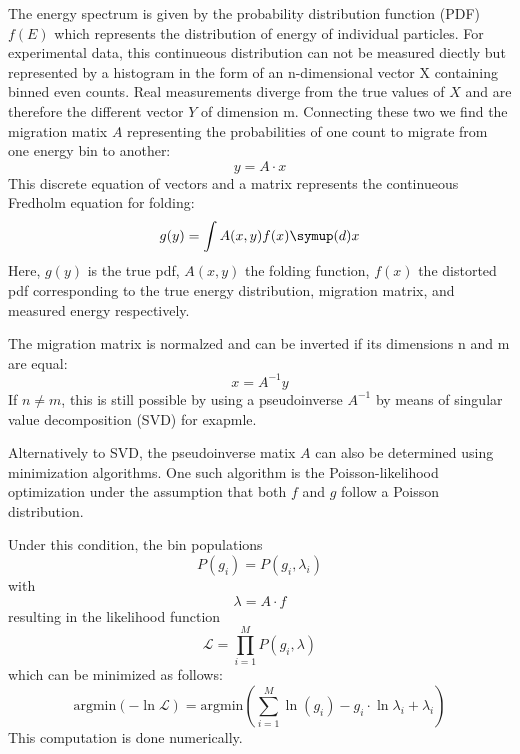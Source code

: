    The energy spectrum is given by the probability distribution function (PDF) $f(E)$ which represents the distribution of energy of individual particles.
    For experimental data, this continueous distribution can not be measured diectly but represented by a histogram in the form of an n-dimensional vector X containing binned even counts.
    Real measurements diverge from the true values of $X$ and are therefore the different vector $Y$ of dimension m.
    Connecting these two we find the migration matix $A$ representing the probabilities of one count to migrate from one energy bin to another:
    \begin{equation}
        y = A \cdot x
        \label{eqn:folding}
    \end{equation} 
    This discrete equation of vectors and a matrix represents the continueous Fredholm equation for folding:
    \begin{equation}
        g(y)= \int A(x,y)f(x) \symup(d)x 
    \end{equation}
    Here, $g(y)$ is the true pdf, $A(x,y)$ the folding function, $f(x)$ the distorted pdf corresponding to the true energy distribution, migration matrix, and measured energy respectively.

    The migration matrix is normalzed and can be inverted if its dimensions n and m are equal:
    \begin{equation}
        x = A^{-1}y
        \label{eqn:unfolding}
    \end{equation}
    If $n \neq m$, this is still possible by using a pseudoinverse $A^{-1}$ by means of singular value decomposition (SVD) for exapmle.
   
    Alternatively to SVD, the pseudoinverse matix $A$ can also be determined using minimization algorithms.
    One such algorithm is the Poisson-likelihood optimization under the assumption that both $f$ and $g$ follow a Poisson distribution.

    Under this condition, the bin populations 
    \begin{equation}
        P(g_i) = P(g_i,\lambda_i)
    \end{equation}
    with 
    \begin{equation}
        \lambda = A \cdot f
    \end{equation}
    resulting in the likelihood function
    \begin{equation}
        \mathcal{L} = \prod_{i=1}^M P(g_i,\lambda)
    \end{equation}
    which can be minimized as follows:
    \begin{equation}
        \text{argmin}(- \ln \mathcal{L})=\text{argmin}\left(\sum_{i=1}^M \ln(g_i \!)-g_i \cdot \ln\lambda_i+\lambda_i\right)
        \label{eq:PoissonLikelihood}
    \end{equation}
    This computation is done numerically.

